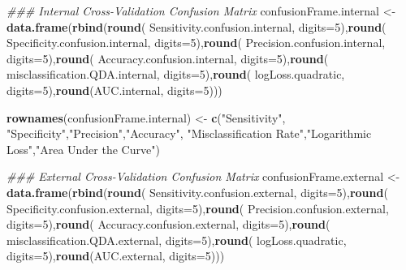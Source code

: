 \documentclass[american,]{article}
\newenvironment{Shaded}{\begin{snugshade}}{\end{snugshade}}
\newcommand{\CommentTok}[1]{\textcolor[rgb]{0.56,0.35,0.01}{\textit{#1}}}
\newcommand{\DataTypeTok}[1]{\textcolor[rgb]{0.13,0.29,0.53}{#1}}
\newcommand{\DecValTok}[1]{\textcolor[rgb]{0.00,0.00,0.81}{#1}}
\newcommand{\KeywordTok}[1]{\textcolor[rgb]{0.13,0.29,0.53}{\textbf{#1}}}
\newcommand{\NormalTok}[1]{#1}
\newcommand{\StringTok}[1]{\textcolor[rgb]{0.31,0.60,0.02}{#1}}
\begin{document}
\begin{Shaded}
\begin{Highlighting}[]

\CommentTok{### Internal Cross-Validation Confusion Matrix}
\NormalTok{confusionFrame.internal <-}\StringTok{ }\KeywordTok{data.frame}\NormalTok{(}\KeywordTok{rbind}\NormalTok{(}\KeywordTok{round}\NormalTok{(}
\NormalTok{Sensitivity.confusion.internal, }\DataTypeTok{digits=}\DecValTok{5}\NormalTok{),}\KeywordTok{round}\NormalTok{(}
\NormalTok{Specificity.confusion.internal, }\DataTypeTok{digits=}\DecValTok{5}\NormalTok{),}\KeywordTok{round}\NormalTok{(}
\NormalTok{Precision.confusion.internal, }\DataTypeTok{digits=}\DecValTok{5}\NormalTok{),}\KeywordTok{round}\NormalTok{(}
\NormalTok{Accuracy.confusion.internal, }\DataTypeTok{digits=}\DecValTok{5}\NormalTok{),}\KeywordTok{round}\NormalTok{(}
\NormalTok{misclassification.QDA.internal, }\DataTypeTok{digits=}\DecValTok{5}\NormalTok{),}\KeywordTok{round}\NormalTok{(}
\NormalTok{logLoss.quadratic, }\DataTypeTok{digits=}\DecValTok{5}\NormalTok{),}\KeywordTok{round}\NormalTok{(AUC.internal, }\DataTypeTok{digits=}\DecValTok{5}\NormalTok{)))}

\KeywordTok{rownames}\NormalTok{(confusionFrame.internal) <-}\StringTok{ }\KeywordTok{c}\NormalTok{(}\StringTok{"Sensitivity"}\NormalTok{,}
\StringTok{"Specificity"}\NormalTok{,}\StringTok{"Precision"}\NormalTok{,}\StringTok{"Accuracy"}\NormalTok{,}
\StringTok{"Misclassification Rate"}\NormalTok{,}\StringTok{"Logarithmic Loss"}\NormalTok{,}\StringTok{"Area Under the Curve"}\NormalTok{)}

\CommentTok{### External Cross-Validation Confusion Matrix}
\NormalTok{confusionFrame.external <-}\StringTok{ }\KeywordTok{data.frame}\NormalTok{(}\KeywordTok{rbind}\NormalTok{(}\KeywordTok{round}\NormalTok{(}
\NormalTok{Sensitivity.confusion.external, }\DataTypeTok{digits=}\DecValTok{5}\NormalTok{),}\KeywordTok{round}\NormalTok{(}
\NormalTok{Specificity.confusion.external, }\DataTypeTok{digits=}\DecValTok{5}\NormalTok{),}\KeywordTok{round}\NormalTok{(}
\NormalTok{Precision.confusion.external, }\DataTypeTok{digits=}\DecValTok{5}\NormalTok{),}\KeywordTok{round}\NormalTok{(}
\NormalTok{Accuracy.confusion.external, }\DataTypeTok{digits=}\DecValTok{5}\NormalTok{),}\KeywordTok{round}\NormalTok{(}
\NormalTok{misclassification.QDA.external, }\DataTypeTok{digits=}\DecValTok{5}\NormalTok{),}\KeywordTok{round}\NormalTok{(}
\NormalTok{logLoss.quadratic, }\DataTypeTok{digits=}\DecValTok{5}\NormalTok{),}\KeywordTok{round}\NormalTok{(AUC.external, }\DataTypeTok{digits=}\DecValTok{5}\NormalTok{)))}


\end{Highlighting}
\end{Shaded}
\end{document}
